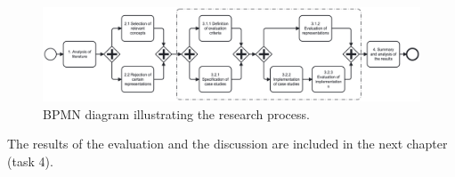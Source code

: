 \begin{figure}
    \centering
    \includegraphics[width=\textwidth]{./3-research-methodology/research-process}
    \caption{BPMN diagram illustrating the research process.}
    \label{fig:research-process}
\end{figure}

The results of the evaluation and the discussion are included in the next chapter (task 4).
